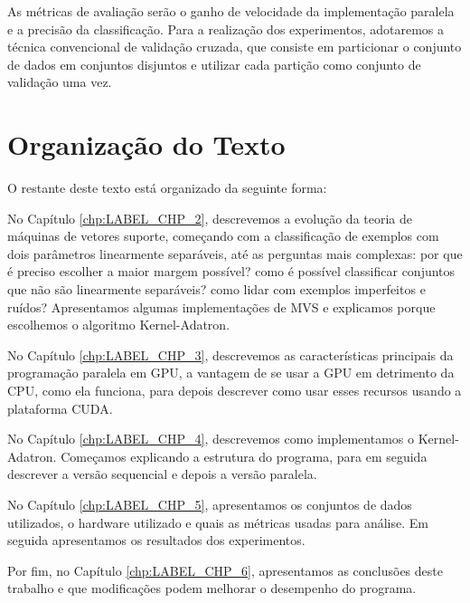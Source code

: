 As métricas de avaliação serão o ganho de velocidade da implementação paralela e a precisão da classificação. Para a realização dos experimentos, adotaremos a técnica convencional de validação cruzada, que consiste em particionar o conjunto de dados em conjuntos disjuntos e utilizar cada partição como conjunto de validação uma vez.

\section{Organização do Texto}\label{sec:LABEL_CHP_1_SEC_C}
O restante deste texto está organizado da seguinte forma: 
\par
No Capítulo \ref{chp:LABEL_CHP_2}, descrevemos a evolução da teoria de máquinas de vetores suporte, começando com a classificação de exemplos com dois parâmetros linearmente separáveis, até as perguntas mais complexas: por que é preciso escolher a maior margem possível? como é possível classificar conjuntos que não são linearmente separáveis? como lidar com exemplos imperfeitos e ruídos? Apresentamos algumas implementações de MVS e explicamos porque escolhemos o algoritmo Kernel-Adatron.

No Capítulo \ref{chp:LABEL_CHP_3}, descrevemos as características principais da programação paralela em GPU, a vantagem de se usar a GPU em detrimento da CPU, como ela funciona, para depois descrever como usar esses recursos usando a plataforma CUDA.

No Capítulo \ref{chp:LABEL_CHP_4}, descrevemos como implementamos o Kernel-Adatron. Começamos explicando a estrutura do programa, para em seguida descrever a versão sequencial e depois a versão paralela.

No Capítulo \ref{chp:LABEL_CHP_5}, apresentamos os conjuntos de dados utilizados, o hardware utilizado e quais as métricas usadas para análise. Em seguida apresentamos os resultados dos experimentos.

Por fim, no Capítulo \ref{chp:LABEL_CHP_6}, apresentamos as conclusões deste trabalho e que modificações podem melhorar o desempenho do programa.